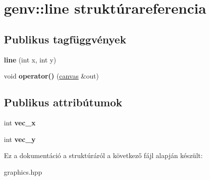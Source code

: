 \hypertarget{structgenv_1_1line}{}\section{genv\+:\+:line struktúrareferencia}
\label{structgenv_1_1line}
\subsection*{Publikus tagfüggvények}
\begin{DoxyCompactItemize}
\item 
\mbox{\label{structgenv_1_1line_a839928e1404ac5125c9e764afcf0141d}} 
{\bfseries line} (int x, int y)
\item 
\mbox{\label{structgenv_1_1line_a51d0a1c02f83cd2c6426cd7491720a11}} 
void {\bfseries operator()} (\hyperlink{classgenv_1_1canvas}{canvas} \&out)
\end{DoxyCompactItemize}
\subsection*{Publikus attribútumok}
\begin{DoxyCompactItemize}
\item 
\mbox{\label{structgenv_1_1line_ab046213bb8b41da64ff5e28074ee15ed}} 
int {\bfseries vec\+\_\+x}
\item 
\mbox{\label{structgenv_1_1line_aaa258c38b2e4843a137b358f9a100ff9}} 
int {\bfseries vec\+\_\+y}
\end{DoxyCompactItemize}


Ez a dokumentáció a struktúráról a következő fájl alapján készült\+:\begin{DoxyCompactItemize}
\item 
graphics.\+hpp\end{DoxyCompactItemize}
